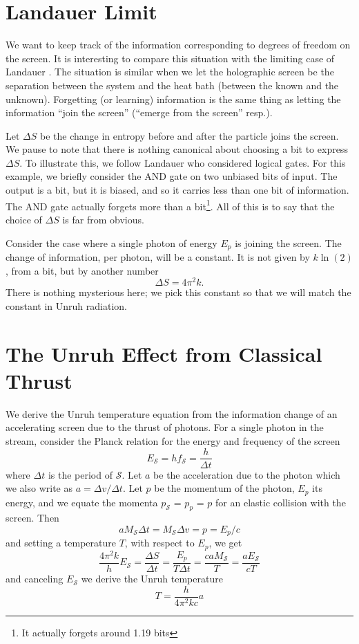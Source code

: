 \documentclass[12pt,a4paper]{article}
\begin{document}
\section{Landauer Limit}
We want to keep track of the information corresponding to degrees of freedom on the screen. It is interesting to compare this situation with the limiting case of Landauer \cite{landauer}.  The situation is similar when we let the holographic screen be the separation between the system and the heat bath (between the known and the unknown).  Forgetting (or learning) information is the same thing as letting the information ``join the screen'' (``emerge from the screen'' resp.).

Let $\Delta S$ be the change in entropy before and after the particle joins the screen. We pause to note that there is nothing canonical about choosing a bit to express $\Delta S$.  To illustrate this, we follow Landauer who considered logical gates. For this example, we briefly consider the AND gate on two unbiased bits of input.  The output is a bit, but it is biased, and so it carries less than one bit of information.  The AND gate actually forgets more than a bit\footnote{It actually forgets around 1.19 bits}.  All of this is to say that the choice of $\Delta S$ is far from obvious.

Consider the case where a single photon of energy $E_p$ is joining the screen.  The change of information, per photon, will be a constant.  It is not given by $k\ln(2)$, from a bit, but by another number
\[
  \Delta S = 4 \pi ^ 2 k.
\]
There is nothing mysterious here; we pick this constant so that we will match the constant in Unruh radiation.

\section{The Unruh Effect from Classical Thrust}

We derive the Unruh temperature equation from the information change of an accelerating screen due to the thrust of photons. For a single photon in the stream, consider the Planck relation for the energy and frequency of the screen
\[
  E_\mathscr{S} = h f_\mathscr{S} = \frac{h}{\Delta t}
\]
where $\Delta t$ is the period of $\mathscr{S}$. Let $a$ be the acceleration due to the photon which we also write as $a = \Delta v / \Delta t$.  Let $p$ be the momentum of the photon, $E_p$ its energy, and we equate the momenta $p_\mathscr{S}$ = $p_p$ = $p$ for an elastic collision with the screen.  Then
\[
  a M_\mathscr{S} \Delta t = M_\mathscr{S}  \Delta v = p = E_p / c
  \]
and setting a temperature $T$, with respect to $E_p$, we get
\[
  \frac{4 \pi^2 k}{h} E_\mathscr{S} = \frac{\Delta S}{\Delta t} = \frac{E_p}{T \Delta t} = \frac{ca M_\mathscr{S}}{T} = \frac{aE_\mathscr{S}}{cT}
\]
and canceling $E_\mathscr{S}$ we derive the Unruh temperature \cite{unruh}
\[
T = \frac{h}{4\pi^2k c} a
\]
\end{document}
